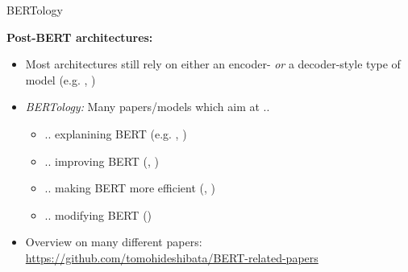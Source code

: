 \begin{frame}{BERTology \href{https://aclanthology.org/2020.tacl-1.54.pdf}{}}

\vfill

\textbf{Post-BERT architectures:}

\begin{itemize}
\item Most architectures still rely on either an encoder- \textit{or} a decoder-style type of model (e.g. \href{https://cdn.openai.com/better-language-models/language_models_are_unsupervised_multitask_learners.pdf}{}, \href{https://arxiv.org/pdf/1906.08237.pdf}{})
\item \textit{BERTology:} Many papers/models which aim at ..
			\begin{itemize}
				\item .. explanining BERT (e.g. \href{https://arxiv.org/pdf/1906.02715.pdf}{}, \href{https://arxiv.org/pdf/1905.10650.pdf}{})
				\item .. improving BERT (\href{https://arxiv.org/pdf/1907.11692.pdf}{}, \href{https://arxiv.org/pdf/1909.11942.pdf}{})
				\item .. making BERT more efficient (\href{https://arxiv.org/pdf/1909.11942.pdf}{}, \href{https://arxiv.org/pdf/1910.01108.pdf}{})
				\item .. modifying BERT (\href{https://arxiv.org/pdf/1910.13461.pdf}{})
			\end{itemize}
\item Overview on many different papers:\\
			\href{https://github.com/tomohideshibata/BERT-related-papers}{https://github.com/tomohideshibata/BERT-related-papers}
\end{itemize}

\vfill

\end{frame}


